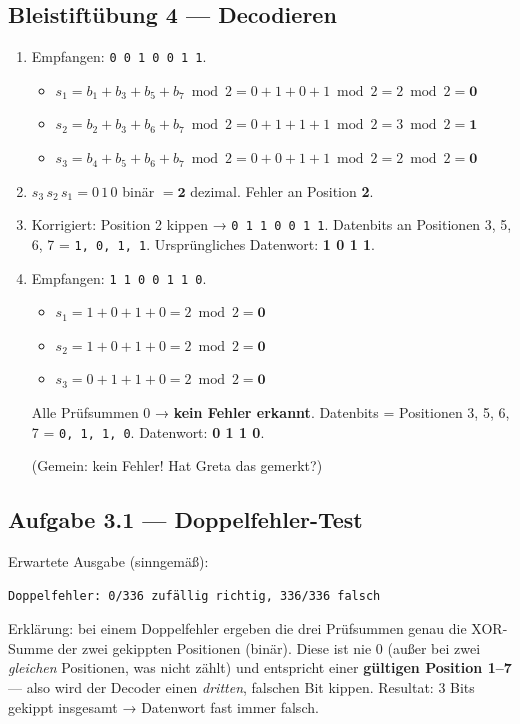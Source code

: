\subsection*{Bleistiftübung 4 — Decodieren}

\begin{enumerate}[label=(\alph*), leftmargin=*]
\item Empfangen: \texttt{0 0 1 0 0 1 1}.
  \begin{itemize}
  \item $s_1 = b_1+b_3+b_5+b_7 \bmod 2 = 0+1+0+1 \bmod 2 = 2 \bmod 2
    = \mathbf{0}$
  \item $s_2 = b_2+b_3+b_6+b_7 \bmod 2 = 0+1+1+1 \bmod 2 = 3 \bmod 2
    = \mathbf{1}$
  \item $s_3 = b_4+b_5+b_6+b_7 \bmod 2 = 0+0+1+1 \bmod 2 = 2 \bmod 2
    = \mathbf{0}$
  \end{itemize}
\item $s_3\, s_2\, s_1 = 0\, 1\, 0$ binär $= \mathbf{2}$ dezimal.
  Fehler an Position \textbf{2}.
\item Korrigiert: Position 2 kippen → \texttt{0 1 1 0 0 1 1}.
  Datenbits an Positionen 3, 5, 6, 7 = \texttt{1, 0, 1, 1}.
  Ursprüngliches Datenwort: \textbf{1 0 1 1}. \checkmark
\item Empfangen: \texttt{1 1 0 0 1 1 0}.
  \begin{itemize}
  \item $s_1 = 1+0+1+0 = 2 \bmod 2 = \mathbf{0}$
  \item $s_2 = 1+0+1+0 = 2 \bmod 2 = \mathbf{0}$
  \item $s_3 = 0+1+1+0 = 2 \bmod 2 = \mathbf{0}$
  \end{itemize}
  Alle Prüfsummen 0 → \textbf{kein Fehler erkannt}. Datenbits =
  Positionen 3, 5, 6, 7 = \texttt{0, 1, 1, 0}. Datenwort:
  \textbf{0 1 1 0}.

  (Gemein: kein Fehler! Hat Greta das gemerkt?)
\end{enumerate}

\subsection*{Aufgabe 3.1 — Doppelfehler-Test}

Erwartete Ausgabe (sinngemäß):

\begin{verbatim}
Doppelfehler: 0/336 zufällig richtig, 336/336 falsch
\end{verbatim}

Erklärung: bei einem Doppelfehler ergeben die drei Prüfsummen genau
die XOR-Summe der zwei gekippten Positionen (binär). Diese ist nie 0
(außer bei zwei \emph{gleichen} Positionen, was nicht zählt) und
entspricht einer \textbf{gültigen Position 1–7} — also wird der
Decoder einen \emph{dritten}, falschen Bit kippen. Resultat: 3 Bits
gekippt insgesamt → Datenwort fast immer falsch.

